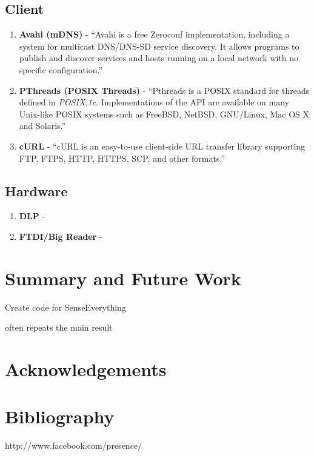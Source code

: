 \documentclass{article}
\begin{document}
	\subsection{Client}
	\begin{enumerate}
		\item	\textbf { Avahi (mDNS) } -
                  ``Avahi is a free Zeroconf implementation, including a system for multicast DNS/DNS-SD service discovery.
                  It allows programs to publish and discover services and hosts running on a local network 
                  with no specific configuration.''

		\item	\textbf { PThreads (POSIX Threads) } -
                  ``Pthreads is a POSIX standard for threads defined in \textit{POSIX.1c}. 
                  Implementations of the API are available on many Unix-like POSIX systems such as 
                  FreeBSD, NetBSD, GNU/Linux, Mac OS X and Solaris.''

		\item	\textbf { cURL } -
                  ``cURL is an easy-to-use client-side URL transfer library supporting 
                  FTP, FTPS, HTTP, HTTPS, SCP, and other formats.''
	\end{enumerate}


	\subsection{Hardware}
	\begin{enumerate}
		\item  { \bf DLP } -

		\item  { \bf FTDI/Big Reader } -

	\end{enumerate}
		

	
\section{Summary and Future Work}
Create code for SenseEverything 

	often repeats the main result 
\section{Acknowledgements}
\section{Bibliography} 
	http://www.facebook.com/presence/
\end{document}
